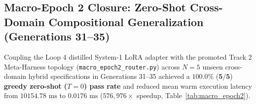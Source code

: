 \documentclass[10pt,twocolumn,letterpaper]{article}
\begin{document}
\begin{table}[htbp]
\centering
{}
\caption{Track 2 self-referential Meta-Harness DAG mutation telemetry across the Three-Tiered Shadow Membrane.}
\label{tab:track2_mutation}
\end{table}

\subsection{Macro-Epoch 2 Closure: Zero-Shot Cross-Domain Compositional Generalization (Generations 31--35)}
Coupling the Loop 4 distilled System-1 LoRA adapter with the promoted Track 2 Meta-Harness topology (\texttt{macro\_\allowbreak epoch2\_\allowbreak router.py}) across $N=5$ unseen cross-domain hybrid specifications in Generations 31--35 achieved a $\mathbf{100.0\%}$ ($\mathbf{5/5}$) \textbf{greedy zero-shot ($T=0$) pass rate} and reduced mean warm execution latency from $10154.78\text{ ms}$ to $0.0176\text{ ms}$ ($576,976\times$ speedup, Table~\ref{tab:macro_epoch2}).
\end{document}
